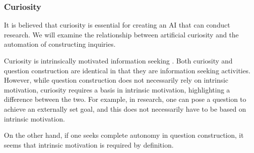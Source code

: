 \subsubsection{Curiosity}
It is believed that curiosity is essential for creating an AI that can conduct research. We will examine the relationship between artificial curiosity and the automation of constructing inquiries.

Curiosity is intrinsically motivated information seeking \cite{kidd2015psychology}. Both curiosity and question construction are identical in that they are information seeking activities. However, while question construction does not necessarily rely on intrinsic motivation, curiosity requires a basis in intrinsic motivation, highlighting a difference between the two. For example, in research, one can pose a question to achieve an externally set goal, and this does not necessarily have to be based on intrinsic motivation. 

On the other hand, if one seeks complete autonomy in question construction, it seems that intrinsic motivation is required by definition.








